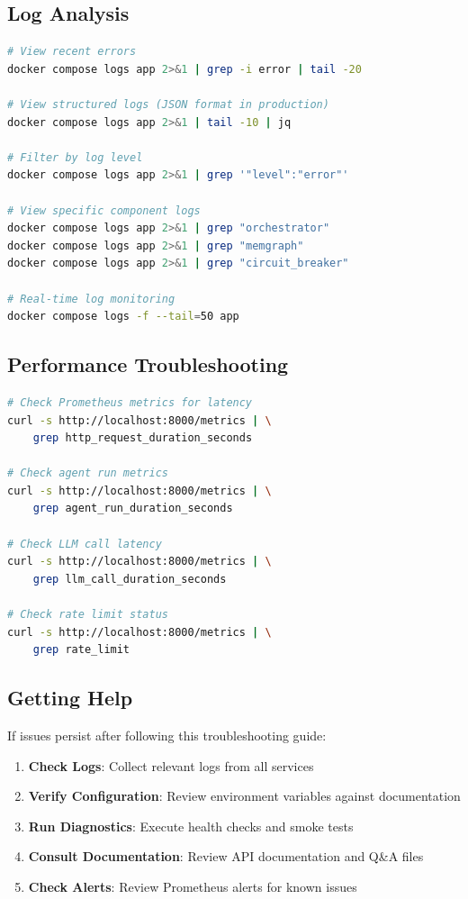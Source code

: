\subsection{Log Analysis}

\begin{lstlisting}[language=bash, caption=Log analysis commands]
# View recent errors
docker compose logs app 2>&1 | grep -i error | tail -20

# View structured logs (JSON format in production)
docker compose logs app 2>&1 | tail -10 | jq

# Filter by log level
docker compose logs app 2>&1 | grep '"level":"error"'

# View specific component logs
docker compose logs app 2>&1 | grep "orchestrator"
docker compose logs app 2>&1 | grep "memgraph"
docker compose logs app 2>&1 | grep "circuit_breaker"

# Real-time log monitoring
docker compose logs -f --tail=50 app
\end{lstlisting}

\subsection{Performance Troubleshooting}

\begin{lstlisting}[language=bash, caption=Performance diagnostics]
# Check Prometheus metrics for latency
curl -s http://localhost:8000/metrics | \
    grep http_request_duration_seconds

# Check agent run metrics
curl -s http://localhost:8000/metrics | \
    grep agent_run_duration_seconds

# Check LLM call latency
curl -s http://localhost:8000/metrics | \
    grep llm_call_duration_seconds

# Check rate limit status
curl -s http://localhost:8000/metrics | \
    grep rate_limit
\end{lstlisting}

\subsection{Getting Help}

If issues persist after following this troubleshooting guide:

\begin{enumerate}
    \item \textbf{Check Logs}: Collect relevant logs from all services
    \item \textbf{Verify Configuration}: Review environment variables against documentation
    \item \textbf{Run Diagnostics}: Execute health checks and smoke tests
    \item \textbf{Consult Documentation}: Review API documentation and Q\&A files
    \item \textbf{Check Alerts}: Review Prometheus alerts for known issues
\end{enumerate}


